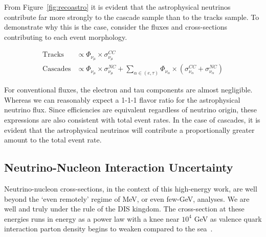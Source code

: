 \documentclass[main.tex]{subfiles}
\begin{document}
From Figure~\ref{fig:recoastro} it is evident that the astrophysical neutrinos contribute far more strongly to the cascade sample than to the tracks sample.
To demonstrate why this is the case, consider the fluxes and cross-sections contributing to each event morphology.

\begin{align}
    \text{Tracks} &\propto \Phi_{\nu_{\mu}}\times \sigma_{\nu_{\mu}}^{CC} \\
    \text{Cascades} &\propto \Phi_{\nu_{\mu}}\times \sigma_{\nu_{\mu}}^{NC}  + \sum_{\alpha\in (e,\tau)}\Phi_{\nu_{\alpha}}\times\left( \sigma_{\nu_{\alpha}}^{CC} +  \sigma_{\nu_{\alpha}}^{NC}\right)
\end{align}

For conventional fluxes, the electron and tau components are almost negligible. 
Whereas we can reasonably expect a 1-1-1 flavor ratio for the astrophysical neutrino flux. 
Since efficiencies are equivalent regardless of neutrino origin, these expressions are also consistent with total event rates. 
In the case of cascades, it is evident that the astrophysical neutrinos will contribute a proportionally greater amount to the total event rate. 

\subsection{Neutrino-Nucleon Interaction Uncertainty}
Neutrino-nucleon cross-sections, in the context of this high-energy work, are well beyond the `even remotely' regime of MeV, or even few-GeV, analyses.
We are well and truly under the rule of the DIS kingdom. 
The cross-section at these energies runs in energy as a power law with a knee near $10^{4}$ GeV as valence quark interaction parton density begins to weaken compared to the sea~\cite{GANDHI199681}.
\end{document}
